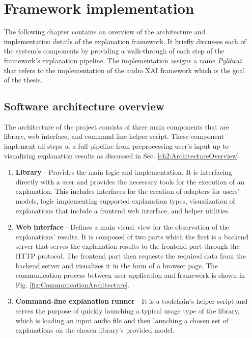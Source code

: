 \documentclass[
    bindingoffset=5mm,  %
    footnoteindent=3mm, %
    hyphenation=true    %
]{src/wut-thesis}
\begin{document}
%
%
\clearpage %
\section{Framework implementation} \label{ch:implementation}

    The following chapter contains an overview of the architecture and implementation details of
    the explanation framework. It briefly discusses each of the system's components by providing
    a walk-through of each step of the framework's explanation pipeline. The implementation assigns
    a name \emph{Pylibxai} that refers to the implementation of the audio XAI framework which is the goal of the thesis.

\subsection{Software architecture overview}

    The architecture of the project consists of three main components that are library, web interface, and command-line helper script.
    These component implement all steps of a full-pipeline from preprocessing
    user's input up to visualizing explanation results as discussed in Sec. \ref{ch2:ArchitectureOverview}.

\begin{enumerate}
    \item \textbf{Library} - Provides the main logic and implementation. It is interfacing directly with a user and
    provides the necessary tools for the execution of an explanation. This includes interfaces for the creation of 
    adapters for users' models, logic implementing supported explanation types, visualization of explanations that 
    include a frontend web interface, and helper utilities.

    \item \textbf{Web interface} - Defines a main visual view for the observation of the explanations' results. It is
    composed of two parts which the first is a backend server that serves the explanation results to the frontend part
    through the HTTP protocol. The frontend part then requests the required data from the backend server and visualizes
    it in the form of a browser page. The communication process between user application and framework is shown in
    Fig. \ref{fig:CommunicationArchitecture}.
 
    \item \textbf{Command-line explanation runner} - It is a toolchain's helper script and serves the purpose of quickly 
    launching a typical usage type of the library, which is loading an input audio file and then launching a chosen set 
    of explanations on the chosen library's provided model.
\end{enumerate}
\end{document}
